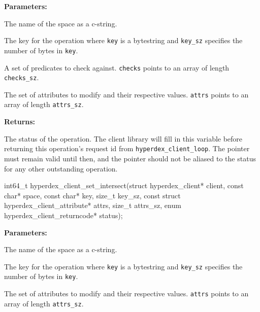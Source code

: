 \noindent\textbf{Parameters:}
\begin{description}[labelindent=\widthof{{\texttt{checks}, \texttt{checks\_sz}}},leftmargin=*,noitemsep,nolistsep,align=right]
\item[\texttt{space}] The name of the space as a c-string.
\item[\texttt{key}, \texttt{key\_sz}] The key for the operation where \texttt{key} is a bytestring and \texttt{key\_sz} specifies the number of bytes in \texttt{key}.
\item[\texttt{checks}, \texttt{checks\_sz}] A set of predicates to check against.  \texttt{checks} points to an array of length \texttt{checks\_sz}.
\item[\texttt{attrs}, \texttt{attrs\_sz}] The set of attributes to modify and their respective values.  \texttt{attrs} points to an array of length \texttt{attrs\_sz}.
\end{description}

\noindent\textbf{Returns:}
\begin{description}[labelindent=\widthof{{\texttt{status}}},leftmargin=*,noitemsep,nolistsep,align=right]
\item[\texttt{status}] The status of the operation.  The client library will fill in this variable before returning this operation's request id from \texttt{hyperdex\_client\_loop}.  The pointer must remain valid until then, and the pointer should not be aliased to the status for any other outstanding operation.
\end{description}

\funcsep
\begin{ccode}
int64_t hyperdex_client_set_intersect(struct hyperdex_client* client,
                const char* space,
                const char* key, size_t key_sz,
                const struct hyperdex_client_attribute* attrs, size_t attrs_sz,
                enum hyperdex_client_returncode* status);
\end{ccode}
\funcdesc 

\noindent\textbf{Parameters:}
\begin{description}[labelindent=\widthof{{\texttt{attrs}, \texttt{attrs\_sz}}},leftmargin=*,noitemsep,nolistsep,align=right]
\item[\texttt{space}] The name of the space as a c-string.
\item[\texttt{key}, \texttt{key\_sz}] The key for the operation where \texttt{key} is a bytestring and \texttt{key\_sz} specifies the number of bytes in \texttt{key}.
\item[\texttt{attrs}, \texttt{attrs\_sz}] The set of attributes to modify and their respective values.  \texttt{attrs} points to an array of length \texttt{attrs\_sz}.
\end{description}

